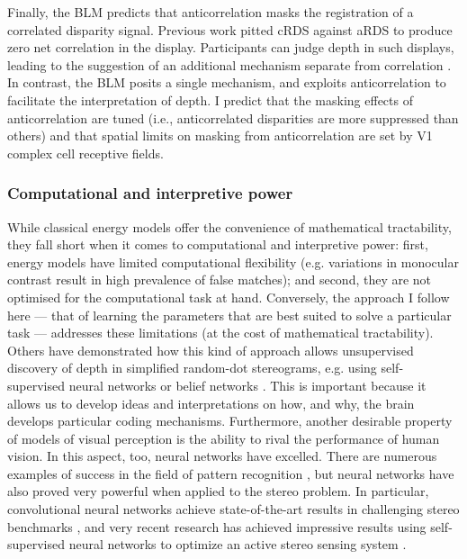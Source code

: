 Finally, the BLM predicts that anticorrelation masks the registration of a correlated disparity signal. Previous work pitted cRDS against aRDS to produce zero net correlation in the display. Participants can judge depth in such displays, leading to the suggestion of an additional mechanism separate from correlation \cite{Doi:2011ku}. In contrast, the BLM posits a single mechanism, and exploits anticorrelation to facilitate the interpretation of depth. I predict that the masking effects of anticorrelation are tuned (i.e., anticorrelated disparities are more suppressed than others) and that spatial limits on masking from anticorrelation are set by V1 complex cell receptive fields.


\subsubsection*{Computational and interpretive power}

While classical energy models offer the convenience of mathematical tractability, they fall short when it comes to computational and interpretive power: first, energy models have limited computational flexibility (e.g. variations in monocular contrast result in high prevalence of false matches); and second, they are not optimised for the computational task at hand. Conversely, the approach I follow here --- that of learning the parameters that are best suited to solve a particular task --- addresses these limitations (at the cost of mathematical tractability). Others have demonstrated how this kind of approach allows unsupervised discovery of depth in simplified random-dot stereograms, e.g. using self-supervised neural networks \cite{Becker:1992kh} or belief networks \cite{Ghahramani:1997:HNF:3008904.3008973}. This is important because it allows us to develop ideas and interpretations on how, and why, the brain develops particular coding mechanisms.
Furthermore, another desirable property of models of visual perception is the ability to rival the performance of human vision. In this aspect, too, neural networks have excelled. There are numerous examples of success in the field of pattern recognition \cite{LeCun:2015ez}, but neural networks have also proved very powerful when applied to the stereo problem. In particular, convolutional neural networks achieve state-of-the-art results in challenging stereo benchmarks \cite{DBLP:journals/corr/ZbontarL14,DBLP:journals/corr/ZbontarL15}, and very recent research has achieved impressive results using self-supervised neural networks to optimize an active stereo sensing system \cite{yizhang:2018}.


